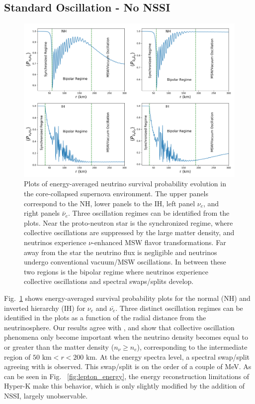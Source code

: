 \documentclass[a4paper,12pt]{article}
\begin{document}
\subsection{Standard Oscillation - No NSSI}
\begin{figure}[t]
\begin{center}
\includegraphics[width=14cm]{flavor_evo_std.png}
\caption{Plots of energy-averaged neutrino survival probability evolution in the core-collapsed supernova environment. The upper panels correspond to the NH, lower panels to the IH, left panel $\nu_{e}$, and right panels $\bar{\nu}_{e}$. Three oscillation regimes can be identified from the plots. Near the proto-neutron star is the synchronized regime, where collective oscillations are suppressed by the large matter density, and neutrinos experience $\nu$-enhanced MSW flavor transformations. Far away from the star the neutrino flux is negligible and neutrinos undergo conventional vacuum/MSW oscillations. In between these two regions is the bipolar regime where neutrinos experience collective oscillations and spectral swaps/splits develop.}
\label{fig:fe_std}
\end{center}
\end{figure}

Fig.~\ref{fig:fe_std} shows energy-averaged survival probability plots for the normal (NH) and inverted hierarchy (IH) for $\nu_{e}$ and $\bar{\nu_{e}}$. Three distinct oscillation regimes can be identified in the plots as a function of the radial distance from the neutrinosphere.  Our results agree with \cite{Duan:2008eb}, and show that collective oscillation phenomena only become important when the neutrino density becomes equal to or greater than the matter density ($n_{\nu} \geq n_{e}$), corresponding to the intermediate region of $50\text{ km} < r < 200\text{ km}$. At the energy spectra level, a spectral swap/split agreeing with \cite{Duan:2008eb} is observed. This swap/split is on the order of a couple of MeV. As can be seen in Fig. ~\ref{fig:lepton_energy}, the energy reconstruction limitations of Hyper-K \cite{Abe:2018uyc} make this behavior, which is only slightly modified by the addition of NSSI, largely unobservable. 
\end{document}
